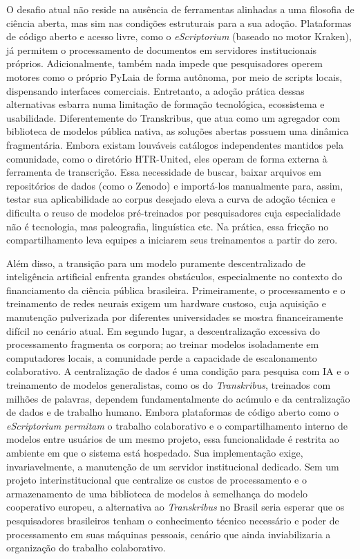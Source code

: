 \documentclass[portuguese]{textolivre}
\begin{document}
O desafio atual não reside na ausência de ferramentas alinhadas a uma filosofia de ciência aberta, mas sim nas condições estruturais para a sua adoção. Plataformas de código aberto e acesso livre, como o \textit{eScriptorium} (baseado no motor Kraken), já permitem o processamento de documentos em servidores institucionais próprios. Adicionalmente, também nada impede que pesquisadores operem motores como o próprio PyLaia de forma autônoma, por meio de scripts locais, dispensando interfaces comerciais. Entretanto, a adoção prática dessas alternativas esbarra numa limitação de formação tecnológica, ecossistema e usabilidade. Diferentemente do Transkribus, que atua como um agregador com biblioteca de modelos pública nativa, as soluções abertas possuem uma dinâmica fragmentária. Embora existam louváveis catálogos independentes mantidos pela comunidade, como o diretório HTR-United, eles operam de forma externa à ferramenta de transcrição. Essa necessidade de buscar, baixar arquivos em repositórios de dados (como o Zenodo) e importá-los manualmente para, assim, testar sua aplicabilidade ao corpus desejado eleva a curva de adoção técnica e dificulta o reuso de modelos pré-treinados por pesquisadores cuja especialidade não é tecnologia, mas paleografia, linguística etc. Na prática, essa fricção no compartilhamento leva equipes a iniciarem seus treinamentos a partir do zero.

Além disso, a transição para um modelo puramente descentralizado de inteligência artificial enfrenta grandes obstáculos, especialmente no contexto do financiamento da ciência pública brasileira. Primeiramente, o processamento e o treinamento de redes neurais exigem um hardware custoso, cuja aquisição e manutenção pulverizada por diferentes universidades se mostra financeiramente difícil no cenário atual. Em segundo lugar, a descentralização excessiva do processamento fragmenta os corpora; ao treinar modelos isoladamente em computadores locais, a comunidade perde a capacidade de escalonamento colaborativo. A centralização de dados é uma condição para pesquisa com IA e o treinamento de modelos generalistas, como os do \textit{Transkribus}, treinados com milhões de palavras, dependem fundamentalmente do acúmulo e da centralização de dados e de trabalho humano. Embora plataformas de código aberto como o \textit{eScriptorium permitam }o trabalho colaborativo e o compartilhamento interno de modelos entre usuários de um mesmo projeto, essa funcionalidade é restrita ao ambiente em que o sistema está hospedado. Sua implementação exige, invariavelmente, a manutenção de um servidor institucional dedicado. Sem um projeto interinstitucional que centralize os custos de processamento e o armazenamento de uma biblioteca de modelos à semelhança do modelo cooperativo europeu, a alternativa ao \textit{Transkribus} no Brasil seria esperar que os pesquisadores brasileiros tenham o conhecimento técnico necessário e poder de processamento em suas máquinas pessoais, cenário que ainda inviabilizaria a organização do trabalho colaborativo.
\end{document}
